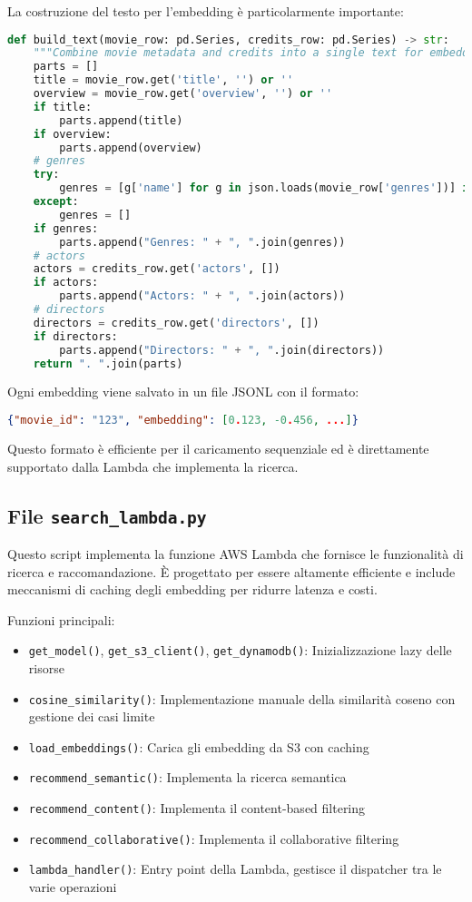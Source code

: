 \documentclass[11pt,a4paper]{article}
\begin{document}
La costruzione del testo per l'embedding è particolarmente importante:

\begin{lstlisting}[language=Python]
def build_text(movie_row: pd.Series, credits_row: pd.Series) -> str:
    """Combine movie metadata and credits into a single text for embedding."""
    parts = []
    title = movie_row.get('title', '') or ''
    overview = movie_row.get('overview', '') or ''
    if title:
        parts.append(title)
    if overview:
        parts.append(overview)
    # genres
    try:
        genres = [g['name'] for g in json.loads(movie_row['genres'])] if pd.notna(movie_row['genres']) else []
    except:
        genres = []
    if genres:
        parts.append("Genres: " + ", ".join(genres))
    # actors
    actors = credits_row.get('actors', [])
    if actors:
        parts.append("Actors: " + ", ".join(actors))
    # directors
    directors = credits_row.get('directors', [])
    if directors:
        parts.append("Directors: " + ", ".join(directors))
    return ". ".join(parts)
\end{lstlisting}

Ogni embedding viene salvato in un file JSONL con il formato:
\begin{lstlisting}[language=json]
{"movie_id": "123", "embedding": [0.123, -0.456, ...]}
\end{lstlisting}

Questo formato è efficiente per il caricamento sequenziale ed è direttamente supportato dalla Lambda che implementa la ricerca.

\subsection{File \texttt{search\_lambda.py}}
Questo script implementa la funzione AWS Lambda che fornisce le funzionalità di ricerca e raccomandazione. È progettato per essere altamente efficiente e include meccanismi di caching degli embedding per ridurre latenza e costi.

Funzioni principali:

\begin{itemize}
  \item \texttt{get\_model()}, \texttt{get\_s3\_client()}, \texttt{get\_dynamodb()}: Inizializzazione lazy delle risorse
  \item \texttt{cosine\_similarity()}: Implementazione manuale della similarità coseno con gestione dei casi limite
  \item \texttt{load\_embeddings()}: Carica gli embedding da S3 con caching
  \item \texttt{recommend\_semantic()}: Implementa la ricerca semantica
  \item \texttt{recommend\_content()}: Implementa il content-based filtering
  \item \texttt{recommend\_collaborative()}: Implementa il collaborative filtering
  \item \texttt{lambda\_handler()}: Entry point della Lambda, gestisce il dispatcher tra le varie operazioni
\end{itemize}
\end{document}
